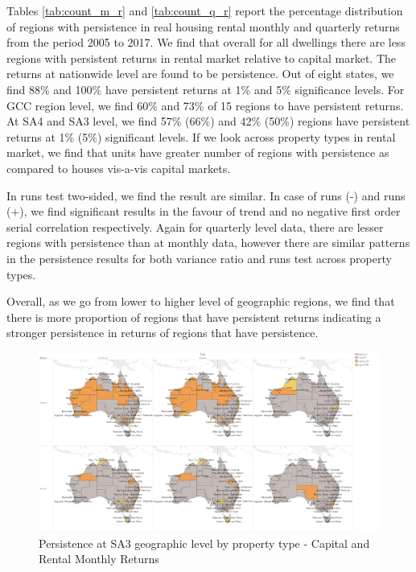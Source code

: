 \documentclass[AEJ,reqno, draftmode]{AEA}
\begin{document}
Tables \ref{tab:count_m_r} and \ref{tab:count_q_r} report the percentage distribution of regions with persistence in real housing rental monthly and quarterly returns from the period 2005 to 2017. We find that overall for all dwellings there are less regions with persistent returns in rental market relative to capital market. The returns at nationwide level are found to be persistence. Out of eight states, we find 88\% and 100\% have persistent returns at 1\% and 5\% significance levels. For GCC region level, we find 60\% and 73\% of 15 regions to have persistent returns. At SA4 and SA3 level, we find 57\% (66\%) and 42\% (50\%) regions have persistent returns at 1\% (5\%) significant levels. If we look across property types in rental market, we find that units have greater number of regions with persistence as compared to houses vis-a-vis capital markets. 

In runs test two-sided, we find the result are similar. In case of runs (-) and runs (+), we find significant results in the favour of trend and no negative first order serial correlation respectively. Again for quarterly level data, there are lesser regions with persistence than at monthly data, however there are similar patterns in the persistence results for both variance ratio and runs test across property types.

Overall, as we go from lower to higher level of geographic regions, we find that there is more proportion of regions that have persistent returns indicating a stronger persistence in returns of regions that have persistence.



%
\restoregeometry



\restoregeometry




\begin{figure}
    \centering
     \includegraphics[width=\columnwidth]{Figures/maps_monthly_all.png}
 \caption{Persistence at SA3 geographic level by property type - Capital and Rental Monthly Returns}
 \label{fig:maps_monthly_all}
\end{figure}
\end{document}
